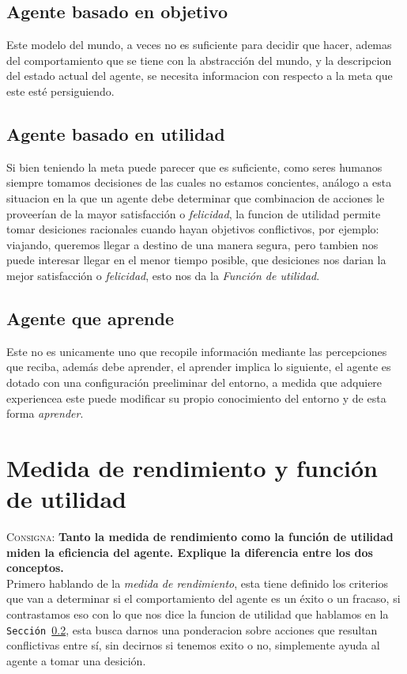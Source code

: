 \documentclass{article}
\begin{document}
\subsection{Agente basado en objetivo}
Este modelo del mundo, a veces no es suficiente para decidir que hacer, ademas del comportamiento que se tiene con la abstracci\'on del mundo, y la descripcion del estado actual del agente, se necesita informacion con respecto a la meta que este est\'e persiguiendo.
\subsection{Agente basado en utilidad}
\label{ref:utilidad}
Si bien teniendo la meta puede parecer que es suficiente, como seres humanos siempre tomamos decisiones de las cuales no estamos concientes, an\'alogo a esta situacion en la que un agente debe determinar que combinacion de acciones le proveer\'ian de la mayor satisfacci\'on o \textit{felicidad}, la funcion de utilidad permite tomar desiciones racionales cuando hayan objetivos conflictivos, por ejemplo: viajando, queremos llegar a destino de una manera segura, pero tambien nos puede interesar llegar en el menor tiempo posible, que desiciones nos darian la mejor satisfacci\'on o \textit{felicidad}, esto nos da la \textit{Funci\'on de utilidad}.
\subsection{Agente que aprende}
Este no es unicamente uno que recopile informaci\'on mediante las percepciones que reciba, adem\'as debe aprender, el aprender implica lo siguiente, el agente es dotado con una configuraci\'on preeliminar del entorno, a medida que adquiere experiencea este puede modificar su propio conocimiento del entorno y de esta forma \textit{aprender}.

\section{Medida de rendimiento y funci\'on de utilidad}
\label{sec:utilidadeficiencia}
\textsc{Consigna}: \textbf{Tanto la medida de rendimiento como la funci\'on de utilidad miden la eficiencia del agente. Explique la diferencia entre los dos conceptos.}\\
Primero hablando de la \textit{medida de rendimiento}, esta tiene definido los criterios que van a determinar si el comportamiento del agente es un \'exito o un fracaso, si contrastamos eso con lo que nos dice la funcion de utilidad que hablamos en la \texttt{Secci\'on \ref{ref:utilidad}}, esta busca darnos una ponderacion sobre acciones que resultan conflictivas entre s\'i, sin decirnos si tenemos exito o no, simplemente ayuda al agente a tomar una desici\'on.
\end{document}
